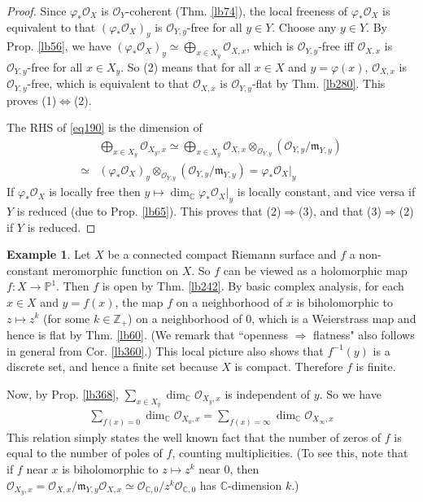 \documentclass[12pt,b5paper,notitlepage]{report}
\theoremstyle{definition}
\newtheorem{eg}[df]{Example}
\theoremstyle{plain}
\newcommand{\scr}{\mathscr}
\newcommand{\Cbb}{\mathbb C}
\newcommand{\Zbb}{\mathbb Z}
\newcommand{\Pbb}{\mathbb P}
\newcommand{\mk}{\mathfrak m}
\numberwithin{equation}{section}
\begin{document}
\begin{proof}
Since $\varphi_*\scr O_X$ is $\scr O_Y$-coherent (Thm. \ref{lb74}), the local freeness of $\varphi_*\scr O_X$ is equivalent to that $(\varphi_*\scr O_X)_y$ is $\scr O_{Y,y}$-free for all $y\in Y$. Choose any $y\in Y$. By Prop. \ref{lb56}, we have $(\varphi_*\scr O_X)_y\simeq\bigoplus_{x\in X_y}\scr O_{X,x}$, which is $\scr O_{Y,y}$-free iff $\scr O_{X,x}$ is $\scr O_{Y,y}$-free for all $x\in X_y$. So (2) means that for all $x\in X$ and $y=\varphi(x)$, $\scr O_{X,x}$ is $\scr O_{Y,y}$-free, which is equivalent to that $\scr O_{X,x}$ is $\scr O_{Y,y}$-flat by Thm. \ref{lb280}. This proves (1)$\Leftrightarrow$(2).

The RHS of \eqref{eq190} is the dimension of
\begin{align*}
&\bigoplus_{x\in X_y}\scr O_{X_y,x}\simeq\bigoplus_{x\in X_y}\scr O_{X,x}\otimes_{\scr O_{Y,y}}(\scr O_{Y,y}/\mk_{Y,y})\\
\simeq& (\varphi_*\scr O_X)_y\otimes_{\scr O_{Y,y}}(\scr O_{Y,y}/\mk_{Y,y})=\varphi_*\scr O_X|_y
\end{align*}
If $\varphi_*\scr O_X$ is locally free then  $y\mapsto \dim_\Cbb\varphi_*\scr O_X|_y$ is locally constant, and vice versa if $Y$ is reduced (due to Prop. \ref{lb65}). This proves that (2)$\Rightarrow$(3), and that (3)$\Rightarrow$(2) if $Y$ is reduced. 
\end{proof}


\begin{eg}
Let $X$ be a connected compact Riemann surface and $f$ a non-constant meromorphic function on $X$. So $f$ can be viewed as a holomorphic map $f:X\rightarrow \Pbb^1$. Then $f$ is open by Thm. \ref{lb242}. By basic complex analysis, for each $x\in X$ and $y=f(x)$, the map $f$ on a neighborhood of $x$ is biholomorphic to $z\mapsto z^k$ (for some $k\in\Zbb_+$) on a neighborhood of $0$, which is a Weierstrass map and hence is flat by Thm. \ref{lb60}. (We remark that ``openness $\Rightarrow$ flatness" also follows in general from Cor. \ref{lb360}.) This local picture also shows that  $f^{-1}(y)$ is a discrete set, and hence a finite set because $X$ is compact. Therefore $f$ is finite.

Now, by Prop. \ref{lb368}, $\sum_{x\in X_y}\dim_\Cbb \scr O_{X_y,x}$ is independent of $y$. So we have
\begin{align*}
\sum_{f(x)=0}\dim_\Cbb \scr O_{X_0,x}=\sum_{f(x)=\infty}\dim_\Cbb \scr O_{X_\infty,x}
\end{align*}
This relation simply states the well known fact that the number of zeros of $f$ is equal to the number of poles of $f$, counting multiplicities. (To see this, note that if $f$ near $x$ is biholomorphic to $z\mapsto z^k$ near $0$, then $\scr O_{X_y,x}=\scr O_{X,x}/\mk_{Y,y}\scr O_{X,x}\simeq\scr O_{\Cbb,0}/z^k\scr O_{\Cbb,0}$ has $\Cbb$-dimension $k$.)
\end{eg}
\end{document}

